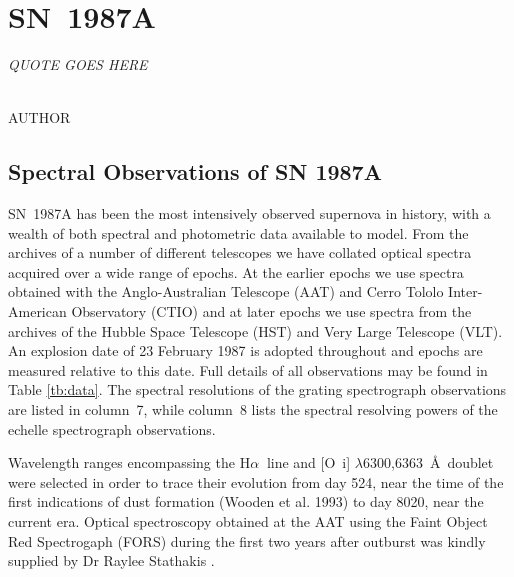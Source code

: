 \chapter{SN~1987A}\label{chp:chp5}

\begin{flushright}
  {\em QUOTE GOES HERE }\\

\ \

\normalsize
{AUTHOR}  
\end{flushright}

\section{Spectral Observations of SN 1987A}
\label{spectra}

SN~1987A has been the most intensively observed supernova in history, with 
a wealth of both spectral and photometric data available to model.  From 
the archives of a number of different telescopes we have collated optical 
spectra acquired over a wide range of epochs.  At the earlier epochs we 
use spectra obtained with the Anglo-Australian Telescope (AAT) and Cerro 
Tololo Inter-American Observatory (CTIO) and at later epochs we 
use spectra from the archives of the Hubble Space Telescope (HST) and Very 
Large Telescope (VLT).  An explosion date of 23 February 1987 is adopted 
throughout and epochs are measured relative to this date.  Full details of 
all observations may be found in Table \ref{tb:data}. The spectral 
resolutions of the grating spectrograph observations are listed in 
column~7, while column~8 lists the spectral resolving powers of the 
echelle spectrograph observations.

Wavelength ranges encompassing the H$\alpha\ $ line and [O~{\sc i}] 
$\lambda$6300,6363~\AA\ doublet were selected in order to trace their 
evolution from day 524, near the time of the first indications of dust 
formation (Wooden et al. 1993) to day 8020, near the current era. Optical 
spectroscopy obtained at the AAT using the Faint Object Red Spectrogaph 
(FORS) during the first two years after outburst was kindly supplied by Dr Raylee 
Stathakis \citep{Spyromilio1991, Spyromilio1993a, Hanuschik1993}.

